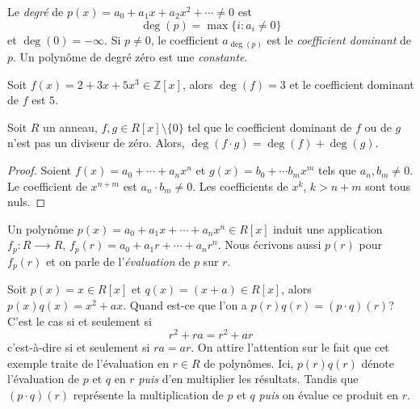 
\begin{definition}
  \label{def:52}
Le \emph{degré} de $p(x) = a_0 + a_1x + a_2x^2 + \cdots \neq 0$ est 
\begin{displaymath}
  \deg(p) = \max\{i \colon  a_i \neq 0\}
\end{displaymath}
et $\deg(0) = -\infty$. 
Si $p \neq 0$, le coefficient $a_{\deg(p)}$ est le \emph{coefficient dominant} de $p$. 
Un polynôme de degré zéro est une \emph{constante}.
\end{definition}

\begin{example}
  \label{exe:35}
  Soit $f(x) = 2 + 3x + 5x^3 ∈ ℤ[x]$, alors $\deg(f) =3$  et le coefficient dominant de $f$ est $5$. 
\end{example}

\begin{theorem}
  \label{thr:34} Soit $R$ un anneau,   $f,g \in R[x] \setminus \{0\}$ tel que le coefficient dominant de $f$ ou de $g$ n'est pas un diviseur de zéro.  Alors, $\deg(f \cdot g) = \deg(f) + \deg(g)$. 
\end{theorem}
\begin{proof}
  
  Soient $f(x) = a_0 + \cdots + a_n x^n$ et $g(x) = b_0+ \cdots b_m x^m$ tels que $a_n, b_m  \neq 0$. Le coefficient de $x^{n+m}$  est $a_n \cdot  b_m \neq 0$. Les coefficients de $x^k$, $k> n+m$ sont tous nuls.  
\end{proof}

Un polynôme $p(x) = a_0 + a_1 x + \cdots + a_n x^n ∈ R[x]$ induit une application $f_p:  R ⟶ R$, $f_p(r) = a_0+ a_1 r+ \cdots + a_n r^n$. Nous écrivons aussi $p(r)$ pour $f_p(r)$ et on parle de l'\emph{évaluation} de $p$ sur $r$. 

\begin{example}
  \label{exe:43}
  Soit $p(x) = x ∈ R[x]$ et $q(x) = (x + a) ∈ R[x]$, alors $p(x) q(x) = x^2 + ax$. Quand est-ce que l'on a $p(r) q(r) = (p ⋅q)(r)$? C'est le cas si et seulement si
  \begin{displaymath}
     r^2 + r a = r^2 + a r  
   \end{displaymath}
   c'est-à-dire si et seulement si $ra = ar$. 
   On attire l'attention sur le fait que cet exemple traite de l'évaluation en $r \in R$ de polynômes. 
   Ici, $p(r)q(r)$ dénote l'évaluation de $p$ et $q$ en $r$ \emph{puis} d'en multiplier les résultats.
   Tandis que $(p⋅q)(r)$ représente la multiplication de $p$ et $q$ \emph{puis} on évalue ce produit en $r$.
\end{example}


